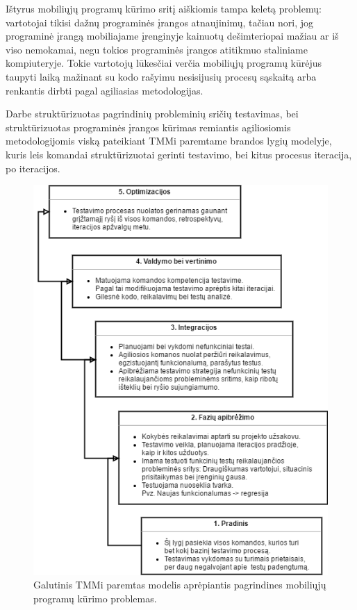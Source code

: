 \documentclass{VUMIFPSkursinis}
\begin{document}
\bigskip
Ištyrus mobiliųjų programų kūrimo sritį aiškiomis tampa keletą problemų: vartotojai tikisi dažnų programinės įrangos atnaujinimų, tačiau nori, jog programinė įrangą mobiliajame įrenginyje kainuotų dešimteriopai mažiau ar iš viso nemokamai, negu tokios programinės įrangos atitikmuo staliniame kompiuteryje. Tokie vartotojų lūkesčiai verčia mobiliųjų programų kūrėjus taupyti laiką mažinant su kodo rašyimu nesisijusių procesų sąskaitą arba renkantis dirbti pagal agiliasias metodologijas.

 Darbe struktūrizuotas pagrindinių probleminių sričių testavimas, bei struktūrizuotas programinės įrangos kūrimas remiantis agiliosiomis metodologijomis viską pateikiant TMMi paremtame brandos lygių modelyje, kuris leis komandai struktūrizuotai gerinti testavimo, bei kitus procesus iteracija, po iteracijos.
\begin{figure}[H]
    \centering
    \includegraphics[scale=0.70]{img/FinalTMMi}
    \caption{Galutinis TMMi paremtas modelis aprėpiantis pagrindines mobiliųjų programų kūrimo problemas.}
    \label{img:finaltmmi}
\end{figure}
\end{document}
